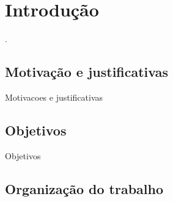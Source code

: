 \chapter{Introdução}

.

\section{Motivação e justificativas}

Motivacoes e justificativas

\section{Objetivos}

Objetivos

\section{Organização do trabalho}